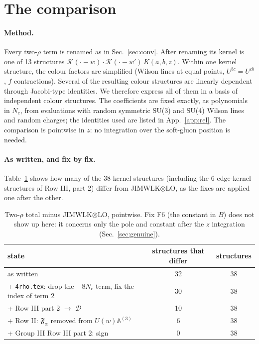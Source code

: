 \documentclass[10pt]{article}
\numberwithin{equation}{section}
\newcommand{\KK}{\mathcal K}
\begin{document}
\section{The comparison}\label{sec:match}
\paragraph{Method.} Every two-$\rho$ term is renamed as in Sec.~\ref{sec:conv}. After renaming its kernel is one of 13 structures $\KK(\cdot-w)\cdot\KK(\cdot-w')\,K(a,b,z)$. Within one kernel structure, the colour factors are simplified (Wilson lines at equal points, $U^{bc}=U^{cb}$, $f$ contractions). Several of the resulting colour structures are linearly dependent through Jacobi-type identities. We therefore express all of them in a basis of independent colour structures. The coefficients are fixed exactly, as polynomials in $N_c$, from evaluations with random symmetric SU(3) and SU(4) Wilson lines and random charges; the identities used are listed in App.~\ref{app:rel}. The comparison is pointwise in $z$: no integration over the soft-gluon position is needed.

\paragraph{As written, and fix by fix.} Table~\ref{tab:states} shows how many of the 38 kernel structures (including the 6 edge-kernel structures of Row III, part 2) differ from JIMWLK$\otimes$LO, as the fixes are applied one after the other.
\begin{table}[h]
\centering\small
\begin{tabular}{@{}l c c@{}}
state & structures that differ & structures\\ \hline
as written & 32 & 38 \\
+ \texttt{4rho.tex}: drop the $-8N_c$ term, fix the index of term 2 & 30 & 38 \\
+ Row III part 2 $\to$ $\mathcal D$ & 10 & 38 \\
+ Row II: $\mathfrak F_\alpha$ removed from $U(w)\mathbb A^{(3)}$ & 6 & 38 \\
+ Group III Row III part 2: sign & 0 & 38 \\
\end{tabular}
\caption{Two-$\rho$ total minus JIMWLK$\otimes$LO, pointwise. Fix F6 (the constant in $B$) does not show up here: it concerns only the pole and constant after the $z$ integration (Sec.~\ref{sec:genuine}).}
\label{tab:states}
\end{table}
\end{document}
